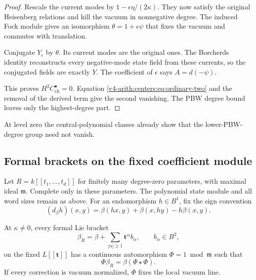 \begin{proof}
Rescale the current
modes by
$1-\epsilon\eta/(2\kappa)$.
They now satisfy
the original Heisenberg
relations and kill
the vacuum in
nonnegative degree.
The induced Fock
module gives an
isomorphism
$\theta=1+\epsilon\psi$
that fixes the
vacuum and commutes
with translation.

Conjugate $Y_\epsilon$
by $\theta$.
Its current modes
are the original
ones. The Borcherds
identity reconstructs
every negative-mode
state field from
these currents, so
the conjugated fields
are exactly $Y$.
The coefficient of
$\epsilon$ says
$A=d(-\psi)$.

This proves
$H^2C^\bullet_{\mathrm{ch}}=0$.
Equation
\eqref{v4-arith:centers:eq:ordinary-two}
and the removal of
the derived term
give the second
vanishing. The
PBW degree bound
leaves only the
highest-degree part.
\end{proof}

At level zero the
central-polynomial
classes already
show that the
lower-PBW-degree
group need not
vanish.

\subsection{Formal brackets on the fixed coefficient module}
\label{v4-arith:centers:subsec:formal-rigidity}

Let $R=k[[t_1,\ldots,t_d]]$
for finitely many
degree-zero parameters,
with maximal ideal
$\mathfrak m$.
Complete only in these
parameters. The
polynomial state
module and all word
sizes remain as above.
For an endomorphism
$h\in B^1$, fix
the sign convention
\[
 (d_\beta h)(x,y)
 =\beta(hx,y)+\beta(x,hy)-h\beta(x,y).
\]

\begin{theorem}\label{v4-arith:centers:thm:formal-rigidity}
At $\kappa\ne0$,
every formal Lie
bracket
\[
 \beta_R=\beta+
 \sum_{|\alpha|\geq1}\mathbf t^\alpha b_\alpha,
 \qquad b_\alpha\in B^2,
\]
on the fixed
$L[[\mathbf t]]$
has a continuous
automorphism
$\Phi=1\bmod\mathfrak m$
such that
\[
 \Phi\beta_R=\beta(\Phi\star\Phi).
\]
If every correction
is vacuum normalized,
$\Phi$ fixes the
local vacuum line.
\end{theorem}

